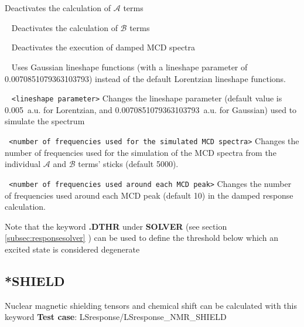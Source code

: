 \begin{description}
Deactivates the calculation of $\mathcal{A}$ terms
\item[\Key{NO BTERM}] \verb| | \newline
Deactivates the calculation of $\mathcal{B}$ terms
\item[\Key{NO DAMPED}] \verb| | \newline
Deactivates the execution of damped MCD spectra
\item[\Key{GAUSSIAN}] \verb| | \newline
Uses Gaussian lineshape functions (with a lineshape parameter of 0.0070851079363103793) 
instead of the default Lorentzian lineshape functions.
\item[\Key{LINESHAPEPARAM}] \verb| | \newline
\verb|<lineshape parameter>|\newline
Changes the lineshape parameter (default value is 0.005~a.u. for Lorentzian, 
and 0.0070851079363103793~a.u. for Gaussian) used to simulate the spectrum
\item[\Key{NSTEPS}] \verb| | \newline
\verb|<number of frequencies used for the simulated MCD spectra>|\newline
Changes the number of frequencies used for the simulation of the MCD spectra from the 
individual $\mathcal{A}$ and $\mathcal{B}$ terms' sticks 
(default 5000).
\item[\Key{NVECFORPEAK}] \verb| | \newline
\verb|<number of frequencies used around each MCD peak>|\newline
Changes the number of frequencies used around each MCD peak (default 10) in the damped response calculation.
\end{description}
Note that the keyword {\bf .DTHR} under {\bf *SOLVER} (see section \ref{subsec:responsesolver} ) can be used to define the threshold below which an excited state is considered degenerate

\subsection{*SHIELD}\label{nmrshield}
Nuclear magnetic shielding tensors and chemical shift can be calculated with this keyword
{\bf Test case}: LSresponse/LSresponse\_NMR\_SHIELD

